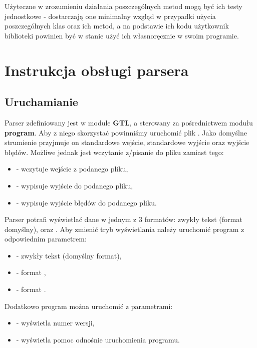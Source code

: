 \documentclass{standalone}
\begin{document}
Użyteczne w zrozumieniu działania poszczególnych metod mogą być ich testy jednostkowe - dostarczają one minimalny wzgląd
w przypadki użycia poszczególnych klas oraz ich metod, a na podstawie ich kodu użytkownik biblioteki powinien być w stanie
użyć ich własnoręcznie w swoim programie.

\chapter{Instrukcja obsługi parsera}

\section{Uruchamianie}

Parser zdefiniowany jest w module \textbf{GTL}, a sterowany za pośrednictwem modułu \textbf{program}. Aby z niego skorzystać
powinniśmy uruchomić plik . Jako domyślne strumienie przyjmuje on standardowe wejście, standardowe wyjście
oraz wyjście błędów. Możliwe jednak jest wczytanie z/pisanie do pliku zamiast tego:
\begin{itemize}
\item {} - wczytuje wejście z podanego pliku,
\item {} - wypisuje wyjście do podanego pliku,
\item {} - wypisuje wyjście błędów do podanego pliku.
\end{itemize}

Parser potrafi wyświetlać dane w jednym z 3 formatów: zwykły tekst (format domyślny),  oraz .
Aby zmienić tryb wyświetlania należy uruchomić program z odpowiednim parametrem:
\begin{itemize}
\item {} - zwykły tekst (domyślny format),
\item {} - format ,
\item {} - format .
\end{itemize}

Dodatkowo program można uruchomić z parametrami:
\begin{itemize}
\item {} - wyświetla numer wersji,
\item {} - wyświetla pomoc odnośnie uruchomienia programu.
\end{itemize}
\end{document}
